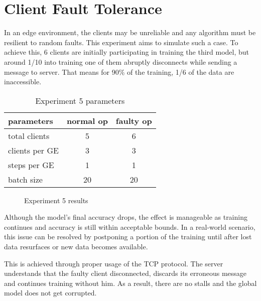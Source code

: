 \section{Client Fault Tolerance}
In an edge environment, the clients may be unreliable and any algorithm must be resilient to random faults. This experiment aims to simulate such a case. To achieve this, 6 clients are initially participating in training the third model, but around 1/10 into training one of them abruptly disconnects while sending a message to server. That means for 90\% of the training, 1/6 of the data are inaccessible.
\begin{table}[H]
    \center
    \begin{tabular}
        { | l | c | c | }
        \hline
        parameters & normal op & faulty op\\\hline
        total clients   & 5 & 6\\\hline
        clients per GE  & 3 & 3\\\hline
        steps per GE    & 1 & 1\\\hline
        batch size      & 20 & 20\\\hline
    \end{tabular}
    \caption[Experiment 5 parameters]{Experiment 5 parameters}
    \label{table:Experiment 5 parameters}
\end{table}
\begin{figure}[H]
    \center
    
    \caption[Experiment 5 results]{Experiment 5 results}
    \label{fig:Experiment 5 results}
\end{figure}
Although the model's final accuracy drops, the effect is manageable as training continues and accuracy is still within acceptable bounds. In a real-world scenario, this issue can be resolved by postponing a portion of the training until after lost data resurfaces or new data becomes available.

This is achieved through proper usage of the TCP protocol. The server understands that the faulty client disconnected, discards its erroneous message and continues training without him. As a result, there are no stalls and the global model does not get corrupted.

